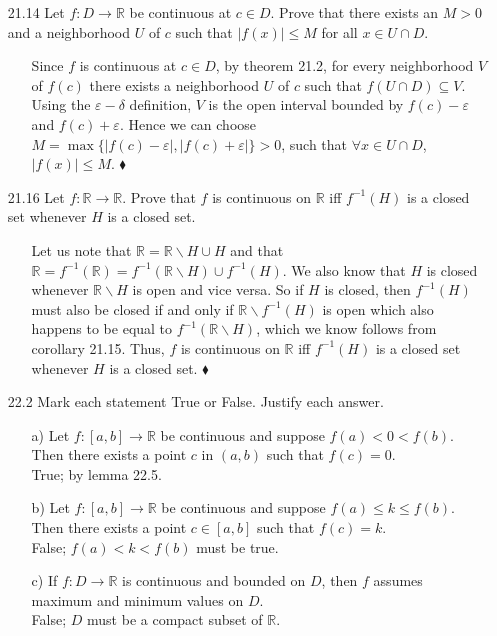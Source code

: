 \documentclass[12pt]{article}
\begin{document}
\begin{enumerate}
\item[21.14] Let $f: D \rightarrow \mathbb{R}$ be continuous at $c \in D$. Prove that there exists an $M > 0$ and a neighborhood $U$ of $c$ such that $|f(x)| \leq M$ for all $x \in U \cap D$.
\begin{enumerate}
\item[] Since $f$ is continuous at $c \in D$, by theorem 21.2, for every neighborhood
$V$ of $f(c)$ there exists a neighborhood $U$ of $c$ such that 
$f(U \cap D) \subseteq V$. Using the $\varepsilon - \delta$ definition, 
$V$ is the open interval bounded by $f(c) - \varepsilon$ and $f(c) + \varepsilon$. 
Hence we can choose $M = \max \{ |f(c) - \varepsilon |, |f(c) + \varepsilon |\} > 0$,
such that $\forall x \in U \cap D$, $|f(x)| \leq M$. $\blacklozenge$
\end{enumerate}

\item[21.16] Let $f: \mathbb{R} \rightarrow \mathbb{R}$. Prove that $f$ is continuous on $\mathbb{R}$ iff $f^{-1}(H)$ is a closed set whenever $H$ is a closed set.
\begin{enumerate}
\item[] Let us note that $\mathbb{R} = \mathbb{R}\backslash H \cup H$ and that
$\mathbb{R} = f^{-1}(\mathbb{R}) = f^{-1}(\mathbb{R}\backslash H) \cup f^{-1}(H)$. 
We also know that $H$ is closed whenever $\mathbb{R}\backslash H$ is open and 
vice versa. So if $H$ is closed, then $f^{-1}(H)$ must also be closed if and 
only if $\mathbb{R}\backslash f^{-1}(H)$ is open which also happens to be equal 
to $f^{-1}(\mathbb{R}\backslash H)$, which we know follows from corollary 21.15.
Thus, $f$ is continuous on $\mathbb{R}$ iff $f^{-1}(H)$ is a closed set
whenever $H$ is a closed set. $\blacklozenge$
\end{enumerate}

\item[22.2] Mark each statement True or False. Justify each answer.
\begin{enumerate}
\item[a)] Let $f : [a, b] \rightarrow \mathbb{R}$ be continuous and suppose $f(a) < 0 < f(b)$. Then there exists a point $c$ in $(a, b)$ such that $f(c) = 0$. \\
True; by lemma 22.5.
\item[b)] Let $f : [a, b] \rightarrow \mathbb{R}$ be continuous and suppose $f(a) \leq k \leq f(b)$. Then there exists a point $c \in [a, b]$ such that $f(c) = k$. \\
False; $f(a) < k < f(b)$ must be true.
\item[c)] If $f: D \rightarrow \mathbb{R}$ is continuous and bounded on $D$, then $f$ assumes maximum and minimum values on $D$. \\
False; $D$ must be a compact subset of $\mathbb{R}$.
\end{enumerate}


\end{enumerate}
\end{document}
